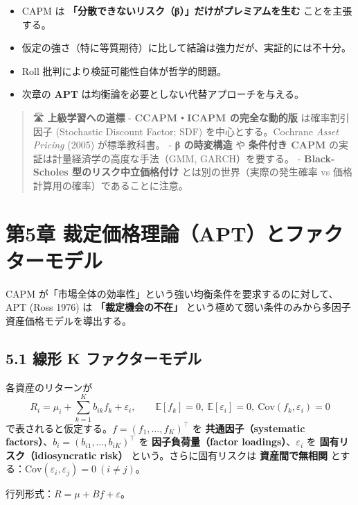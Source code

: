 \documentclass[11pt,a4paper]{report}
\begin{document}
\begin{itemize}
\item CAPM は \textbf{「分散できないリスク（β）」だけがプレミアムを生む} ことを主張する。
\item 仮定の強さ（特に等質期待）に比して結論は強力だが、実証的には不十分。
\item Roll 批判により検証可能性自体が哲学的問題。
\item 次章の \textbf{APT} は均衡論を必要としない代替アプローチを与える。
\end{itemize}

\begin{quote}
🛣 \textbf{上級学習への道標}
- \textbf{CCAPM・ICAPM の完全な動的版} は確率割引因子 (Stochastic Discount Factor; SDF) を中心とする。Cochrane \emph{Asset Pricing} (2005) が標準教科書。
- \textbf{β の時変構造} や \textbf{条件付き CAPM} の実証は計量経済学の高度な手法（GMM, GARCH）を要する。
- \textbf{Black-Scholes 型のリスク中立価格付け} とは別の世界（実際の発生確率 vs 価格計算用の確率）であることに注意。
\end{quote}

\noindent\hrulefill

\chapter{第5章 裁定価格理論（APT）とファクターモデル}

CAPM が「市場全体の効率性」という強い均衡条件を要求するのに対して、APT (Ross 1976) は \textbf{「裁定機会の不在」} という極めて弱い条件のみから多因子資産価格モデルを導出する。

\section{5.1 線形 K ファクターモデル}

各資産のリターンが \[ R_i = \mu_i + \sum_{k=1}^K b_{ik} f_k + \varepsilon_i, \qquad \mathbb{E}[f_k] = 0,\ \mathbb{E}[\varepsilon_i] = 0,\ \mathrm{Cov}(f_k, \varepsilon_i) = 0 \] で表されると仮定する。$f = (f_1, \dots, f_K)^\top$ を \textbf{共通因子（systematic factors）}、$b_i = (b_{i1}, \dots, b_{iK})^\top$ を \textbf{因子負荷量（factor loadings）}、$\varepsilon_i$ を \textbf{固有リスク（idiosyncratic risk）} という。さらに固有リスクは \textbf{資産間で無相関} とする：$\mathrm{Cov}(\varepsilon_i, \varepsilon_j) = 0\ (i \neq j)$。

行列形式：$R = \mu + B f + \varepsilon$。
\end{document}
